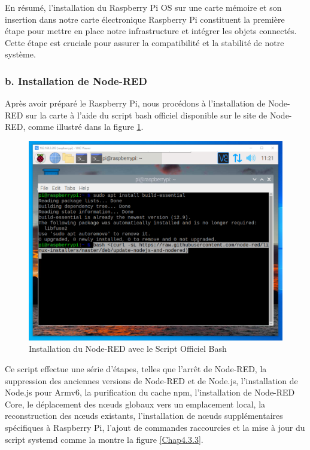 En résumé, l'installation du Raspberry Pi OS sur une carte mémoire et son insertion dans notre carte électronique Raspberry Pi constituent la première étape pour mettre en place notre infrastructure et intégrer les objets connectés. Cette étape est cruciale pour assurer la compatibilité et la stabilité de notre système.

\subsubsection{b. Installation de Node-RED}

Après avoir préparé le Raspberry Pi, nous procédons à l'installation de Node-RED sur la carte à l'aide du script bash officiel disponible sur le site de Node-RED, comme illustré dans la figure \ref{Chap4.3.2}.

\begin{figure}[H]
 \centering
    \includegraphics[width=15cm]{Images/NodeRedInstall1.png}
    \caption{Installation du Node-RED avec le Script Officiel Bash}
    \label{Chap4.3.2}
\end{figure}    

Ce script effectue une série d'étapes, telles que l'arrêt de Node-RED, la suppression des anciennes versions de Node-RED et de Node.js, l'installation de Node.js pour Armv6, la purification du cache npm, l'installation de Node-RED Core, le déplacement des nœuds globaux vers un emplacement local, la reconstruction des nœuds existants, l'installation de nœuds supplémentaires spécifiques à Raspberry Pi, l'ajout de commandes raccourcies et la mise à jour du script systemd comme la montre la figure \ref{Chap4.3.3}.

